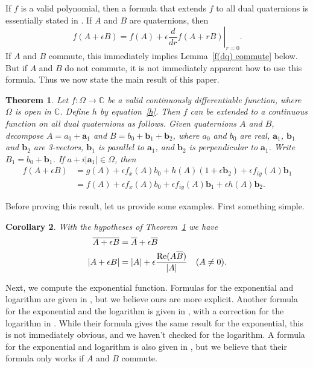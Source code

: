 \documentclass[12pt,reqno]{amsart}
\newtheorem{theorem}{Theorem}
\newtheorem{cor}[theorem]{Corollary}
\begin{document}
If $f$ is a valid polynomial, then a formula that extends $f$ to all dual quaternions is essentially stated in \cite{wiki-1}.  If $A$ and $B$ are quaternions, then
\begin{equation}
\label{proto f(dq)}
f(A + \epsilon B) = f(A) + \epsilon \left.\frac d{dr} f(A + rB) \right|_{r=0}.
\end{equation}
If $A$ and $B$ commute, this immediately implies Lemma~\ref{f(dq) commute} below.  But if $A$ and $B$ do not commute, it is not immediately apparent how to use this formula.  Thus we now state the main result of this paper.

\begin{theorem}
\label{f(dq)}
Let $f:\Omega \to \mathbb C$ be a valid continuously differentiable function, where $\Omega$ is open in $\mathbb C$.  Define $h$ by equation~\eqref{h}.  Then $f$ can be extended to a continuous function on all dual quaternions as follows.  Given quaternions $A$ and $B$, decompose $A = a_0 + \bm a_1$ and $B = b_0 + \bm b_1 + \bm b_2$, where $a_0$ and $b_0$ are real, $\bm a_1$, $\bm b_1$ and $\bm b_2$ are 3-vectors, $\bm b_1$ is parallel to $\bm a_1$, and $\bm b_2$ is perpendicular to $\bm a_1$.  Write $B_1 = b_0 + \bm b_1$.  If $a + i |\bm a_1| \in \Omega$, then
\begin{align}
f(A + \epsilon B)
&= g(A) 
+ \epsilon f_x(A) b_0
+ h(A) (1 + \epsilon \bm b_2)
+ \epsilon f_{iy}(A) \bm b_1 \\
&= f(A) 
+ \epsilon f_x(A) b_0
+ \epsilon f_{iy}(A) \bm b_1
+ \epsilon h(A) \bm b_2 .
\end{align}
\end{theorem}

Before proving this result, let us provide some examples.  First something simple.

\begin{cor}
With the hypotheses of Theorem~\ref{f(dq)} we have
\begin{align}
\overline{A + \epsilon B} &= \overline{A} + \epsilon \overline{B} \\
|A + \epsilon B| &= |A| + \epsilon \frac{\text{\rm Re}(A \overline B)}{|A|} \quad (A \ne 0) .
\end{align}
\end{cor}

Next, we compute the exponential function.  Formulas for the exponential and logarithm are given in \cite{wang-et-al}, but we believe ours are more explicit.  Another formula for the exponential and the logarithm is given in \cite{selig}, with a correction for the logarithm in \cite{wu-et-al}.  While their formula gives the same result for the exponential, this is not immediately obvious, and we haven't checked for the logarithm.  A formula for the exponential and logarithm is also given in \cite{han-et-al}, but we believe that their formula only works if $A$ and $B$ commute.
\end{document}
